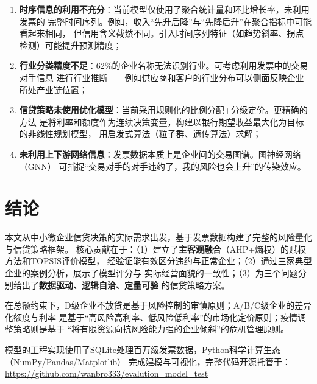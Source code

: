 \documentclass[12pt,a4paper]{ctexart}
\begin{document}
\begin{enumerate}
    \item \textbf{时序信息的利用不充分}：当前模型仅使用了聚合统计量和环比增长率，未利用发票的
          完整时间序列。例如，收入``先升后降''与``先降后升''在聚合指标中可能看起来相同，
          但信用含义截然不同。引入时间序列特征（如趋势斜率、拐点检测）可能提升预测精度；
    \item \textbf{行业分类精度不足}：62\%的企业名称无法识别行业。可考虑利用发票中的交易对手信息
          进行行业推断——例如供应商和客户的行业分布可以侧面反映企业所处产业链位置；
    \item \textbf{信贷策略未使用优化模型}：当前采用规则化的比例分配+分级定价。更精确的方法
          是将利率和额度作为连续决策变量，构建以银行期望收益最大化为目标的非线性规划模型，
          用启发式算法（粒子群、遗传算法）求解；
    \item \textbf{未利用上下游网络信息}：发票数据本质上是企业间的交易图谱。图神经网络（GNN）
          可捕捉``交易对手的对手违约了，我的风险也会上升''的传染效应。
\end{enumerate}

\section{结论}

本文从中小微企业信贷决策的实际需求出发，基于发票数据构建了完整的风险量化与信贷策略框架。
核心贡献在于：（1）建立了\textbf{主客观融合}（AHP+熵权）的赋权方法和TOPSIS评价模型，
经验证能有效区分违约与正常企业；（2）通过三家典型企业的案例分析，展示了模型评分与
实际经营面貌的一致性；（3）为三个问题分别给出了\textbf{数据驱动、逻辑自洽、定量可验}
的信贷策略方案。

在总额约束下，D级企业不放贷是基于风险控制的审慎原则；A/B/C级企业的差异化额度与利率
是基于``高风险高利率、低风险低利率''的市场化定价原则；疫情调整策略则是基于
``将有限资源向抗风险能力强的企业倾斜''的危机管理原则。

模型的工程实现使用了SQLite处理百万级发票数据，Python科学计算生态（NumPy/Pandas/Matplotlib）
完成建模与可视化，完整代码开源托管于：\\
\url{https://github.com/wanbro333/evalution_model_test}
\end{document}
